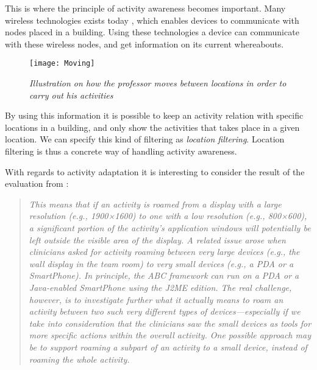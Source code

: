 This is where the principle of activity awareness becomes important. Many wireless technologies exists today \citet{wirelessWiki}, which enables devices to communicate with nodes placed in a building. Using these technologies a device can communicate with these wireless nodes, and get information on its current whereabouts.

\begin{figure}[h!]
  \centering
    \texttt{[image: Moving]}
  \caption{\emph{Illustration on how the professor moves between locations in order to carry out his activities}}
  \label{fig:locationmovement}
\end{figure}

By using this information it is possible to keep an activity relation with specific locations in a building, and only show the activities that takes place in a given location. We can specify this kind of filtering as \emph{location filtering}. Location filtering is thus a concrete way of handling activity awareness.

With regards to activity adaptation it is interesting to consider the result of the evaluation from \citet{bardram2009}:
\begin{quotation}
	\emph{
		This means that if an activity is roamed from a display with a large resolution (e.g., 1900×1600) to one with a low resolution (e.g., 800×600), a significant portion of the activity’s application windows will potentially be left outside the visible area of the display. A related issue arose when clinicians asked for activity roaming between very large devices (e.g., the wall display in the team room) to very small devices (e.g., a PDA or a SmartPhone). In principle, the ABC framework can run on a PDA or a Java-enabled SmartPhone using the J2ME edition. The real challenge, however, is to investigate further what it actually means to roam an activity between two such very different types of devices—especially if we take into consideration that the clinicians saw the small devices as tools for more specific actions within the overall activity. One possible approach may be to support roaming a subpart of an activity to a small device, instead of roaming the whole activity.
	}
\end{quotation}

